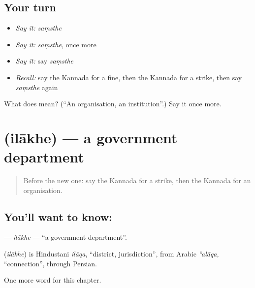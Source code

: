 \subsection*{Your turn}
\begin{itemize}
\raggedright
  \item \emph{Say it:} \emph{saṃsthe}
  \item \emph{Say it:} \emph{saṃsthe}, once more
  \item \emph{Say it:} say \emph{saṃsthe}
  \item \emph{Recall:} say the Kannada for a fine, then the Kannada for a strike, then say \emph{saṃsthe} again
\end{itemize}

\begin{tcolorbox}[breakable,colback=teal!4,colframe=teal!35!black,title={Before you move on}]
What does  mean? (\textquotedblleft{}An organisation, an institution\textquotedblright{}.) Say it once more.
\end{tcolorbox}
\section[\texorpdfstring{\kn{ಇಲಾಖೆ} (ilākhe)}{ಇಲಾಖೆ (ilākhe)}]{ (ilākhe) — a government department}

\label{lesson:KA-C271-ilakhe}



\begin{quote}
Before the new one: say the Kannada for a strike, then the Kannada for an organisation.
\end{quote}

\subsection*{You'll want to know: }
\textbf{} — \emph{ilākhe} — \textquotedblleft{}a government department\textquotedblright{}.

\begin{cousinweb}
\textbf{} (\emph{ilākhe}) is Hindustani \emph{ilāqa}, \textquotedblleft{}district, jurisdiction\textquotedblright{}, from Arabic \emph{ʿalāqa}, \textquotedblleft{}connection\textquotedblright{}, through Persian.
\end{cousinweb}

\begin{grammarlens}[title={What you've built}]
One more word for this chapter.
\end{grammarlens}

